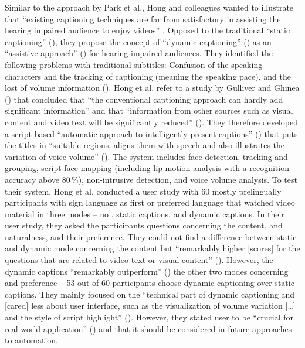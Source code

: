 \largerpage
Similar to the approach by Park et al., Hong and colleagues wanted to illustrate that “existing captioning techniques are far from satisfactory in assisting the hearing impaired audience to enjoy videos” \citep{Hong2010}. Opposed to the traditional “static captioning” (\citeyear{Hong2010}), they propose the concept of “dynamic captioning” (\citeyear{Hong2010}) as an “assistive approach” (\citeyear{Hong2010}) for hearing-impaired audiences. They identified the following problems with traditional subtitles: Confusion of the speaking characters and the tracking of captioning (meaning the speaking pace), and the lost of volume information (\citeyear{Hong2010}). Hong et al. refer to a study by Gulliver and Ghinea (\citeyear{Gulliver2003}) that concluded that “the conventional captioning approach can hardly add significant information” and that “information from other sources such as visual content and video text will be significantly reduced” (\citeyear{Gulliver2003}). They therefore developed a script-based “automatic approach to intelligently present captions” (\citeyear{Gulliver2003}) that puts the titles in “suitable regions, aligns them with speech and also illustrates the variation of voice volume” (\citeyear{Gulliver2003}). The system includes face detection, tracking and grouping, script-face mapping (including lip motion analysis with a recognition accuracy above 80\,\%), non-intrusive detection, and voice volume analysis. To test their system, Hong et al. conducted a user study with 60 mostly prelingually  participants with sign language as first or preferred language that watched video material in three modes – no , static captions, and dynamic captions. In their user study, they asked the participants questions concerning the content,  and naturalness, and their preference. They could not find a difference between static and dynamic mode concerning the content but “remarkably higher [scores] for the questions that are related to video text or visual content” (\citeyear{Gulliver2003}). However, the dynamic captions “remarkably outperform” (\citeyear{Gulliver2003}) the other two modes concerning  and preference – 53 out of 60 participants choose dynamic captioning over static captions. They mainly focused on the “technical part of dynamic captioning and [cared] less about user interface, such as the visualization of volume variation […] and the style of script highlight” (\citeyear{Gulliver2003}). However, they stated user  to be “crucial for real-world application” (\citeyear{Gulliver2003}) and that it should be considered in future approaches to automation.

